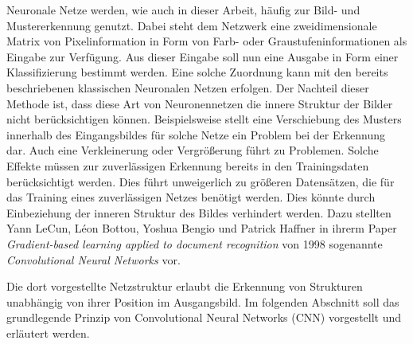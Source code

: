 \documentclass[../main.tex]{subfiles}
\begin{document}
Neuronale Netze werden, wie auch in dieser Arbeit, häufig zur Bild- und Mustererkennung genutzt. Dabei steht dem Netzwerk eine zweidimensionale Matrix von Pixelinformation in Form von Farb- oder Graustufeninformationen als Eingabe zur Verfügung. Aus dieser Eingabe soll nun eine Ausgabe in Form einer Klassifizierung bestimmt werden.  Eine solche Zuordnung kann mit den bereits beschriebenen klassischen Neuronalen Netzen erfolgen. Der Nachteil dieser Methode ist, dass diese Art von Neuronennetzen die innere Struktur der Bilder nicht berücksichtigen können. Beispielsweise stellt eine Verschiebung des Musters innerhalb des Eingangsbildes für solche Netze ein Problem bei der Erkennung dar. Auch eine Verkleinerung oder Vergrößerung führt zu Problemen. Solche Effekte müssen zur zuverlässigen Erkennung bereits in den Trainingsdaten berücksichtigt werden. Dies führt unweigerlich zu größeren Datensätzen, die für das Training eines zuverlässigen Netzes benötigt werden. Dies könnte durch Einbeziehung der inneren Struktur des Bildes verhindert werden. Dazu stellten Yann LeCun, Léon Bottou, Yoshua Bengio und Patrick Haffner in ihrerm Paper \emph{Gradient-based learning applied to document recognition} von 1998 sogenannte \emph{Convolutional Neural Networks} vor. \par Die dort vorgestellte Netzstruktur erlaubt die Erkennung von Strukturen unabhängig von ihrer Position im Ausgangsbild. Im folgenden Abschnitt soll das grundlegende Prinzip von Convolutional Neural Networks (CNN) vorgestellt und erläutert werden.
\end{document}
